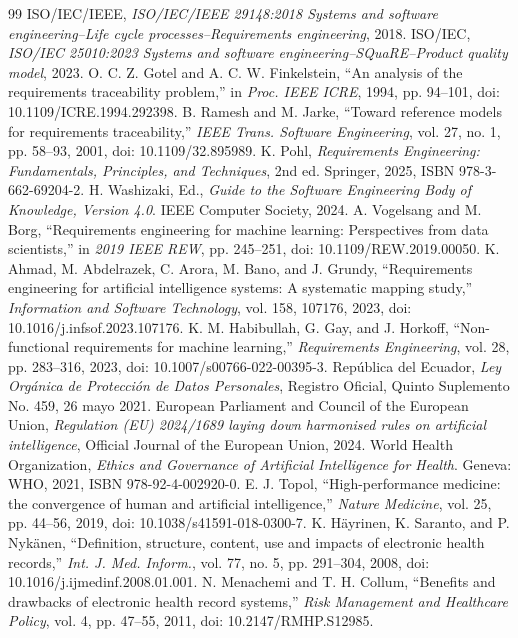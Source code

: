 \documentclass[11pt,a4paper]{article}
\begin{document}
		\begin{thebibliography}{99}
		 ISO/IEC/IEEE, \emph{ISO/IEC/IEEE 29148:2018 Systems and software engineering--Life cycle processes--Requirements engineering}, 2018.
		 ISO/IEC, \emph{ISO/IEC 25010:2023 Systems and software engineering--SQuaRE--Product quality model}, 2023.
		 O. C. Z. Gotel and A. C. W. Finkelstein, ``An analysis of the requirements traceability problem,'' in \emph{Proc. IEEE ICRE}, 1994, pp. 94--101, doi: 10.1109/ICRE.1994.292398.
		 B. Ramesh and M. Jarke, ``Toward reference models for requirements traceability,'' \emph{IEEE Trans. Software Engineering}, vol. 27, no. 1, pp. 58--93, 2001, doi: 10.1109/32.895989.
		 K. Pohl, \emph{Requirements Engineering: Fundamentals, Principles, and Techniques}, 2nd ed. Springer, 2025, ISBN 978-3-662-69204-2.
		 H. Washizaki, Ed., \emph{Guide to the Software Engineering Body of Knowledge, Version 4.0}. IEEE Computer Society, 2024.
		 A. Vogelsang and M. Borg, ``Requirements engineering for machine learning: Perspectives from data scientists,'' in \emph{2019 IEEE REW}, pp. 245--251, doi: 10.1109/REW.2019.00050.
		 K. Ahmad, M. Abdelrazek, C. Arora, M. Bano, and J. Grundy, ``Requirements engineering for artificial intelligence systems: A systematic mapping study,'' \emph{Information and Software Technology}, vol. 158, 107176, 2023, doi: 10.1016/j.infsof.2023.107176.
		 K. M. Habibullah, G. Gay, and J. Horkoff, ``Non-functional requirements for machine learning,'' \emph{Requirements Engineering}, vol. 28, pp. 283--316, 2023, doi: 10.1007/s00766-022-00395-3.
		 República del Ecuador, \emph{Ley Orgánica de Protección de Datos Personales}, Registro Oficial, Quinto Suplemento No. 459, 26 mayo 2021.
		 European Parliament and Council of the European Union, \emph{Regulation (EU) 2024/1689 laying down harmonised rules on artificial intelligence}, Official Journal of the European Union, 2024.
		 World Health Organization, \emph{Ethics and Governance of Artificial Intelligence for Health}. Geneva: WHO, 2021, ISBN 978-92-4-002920-0.
		 E. J. Topol, ``High-performance medicine: the convergence of human and artificial intelligence,'' \emph{Nature Medicine}, vol. 25, pp. 44--56, 2019, doi: 10.1038/s41591-018-0300-7.
		 K. Häyrinen, K. Saranto, and P. Nykänen, ``Definition, structure, content, use and impacts of electronic health records,'' \emph{Int. J. Med. Inform.}, vol. 77, no. 5, pp. 291--304, 2008, doi: 10.1016/j.ijmedinf.2008.01.001.
		 N. Menachemi and T. H. Collum, ``Benefits and drawbacks of electronic health record systems,'' \emph{Risk Management and Healthcare Policy}, vol. 4, pp. 47--55, 2011, doi: 10.2147/RMHP.S12985.
	\end{thebibliography}
\end{document}
